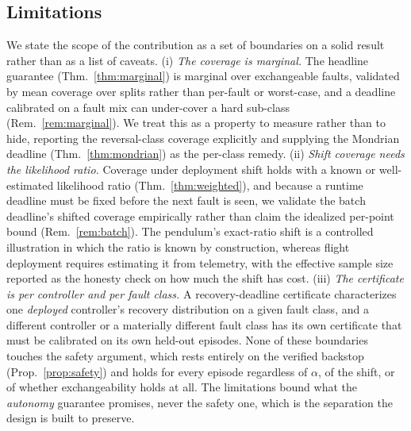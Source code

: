 \documentclass[journal]{IEEEtran}
\theoremstyle{plain}
\theoremstyle{definition}
\begin{document}
\subsection{Limitations}
\label{sec:limits}
We state the scope of the contribution as a set of boundaries on a solid result rather than as
a list of caveats. (i) \emph{The coverage is marginal.} The headline guarantee
(Thm.~\ref{thm:marginal}) is marginal over exchangeable faults, validated by mean coverage
over splits rather than per-fault or worst-case, and a deadline calibrated on a fault mix can
under-cover a hard sub-class (Rem.~\ref{rem:marginal}). We treat this as a property to measure
rather than to hide, reporting the reversal-class coverage explicitly and supplying the
Mondrian deadline (Thm.~\ref{thm:mondrian}) as the per-class remedy. (ii) \emph{Shift coverage
needs the likelihood ratio.} Coverage under deployment shift holds with a known or
well-estimated likelihood ratio (Thm.~\ref{thm:weighted}), and because a runtime deadline must
be fixed before the next fault is seen, we validate the batch deadline's shifted coverage
empirically rather than claim the idealized per-point bound (Rem.~\ref{rem:batch}). The
pendulum's exact-ratio shift is a controlled illustration in which the ratio is known by
construction, whereas flight deployment requires estimating it from telemetry, with the
effective sample size reported as the honesty check on how much the shift has cost. (iii)
\emph{The certificate is per controller and per fault class.} A recovery-deadline certificate
characterizes one \emph{deployed} controller's recovery distribution on a given fault class,
and a different controller or a materially different fault class has its own certificate that
must be calibrated on its own held-out episodes. None of these boundaries touches the safety
argument, which rests entirely on the verified backstop (Prop.~\ref{prop:safety}) and holds
for every episode regardless of $\alpha$, of the shift, or of whether exchangeability holds at
all. The limitations bound what the \emph{autonomy} guarantee promises, never the safety one,
which is the separation the design is built to preserve.
\end{document}
